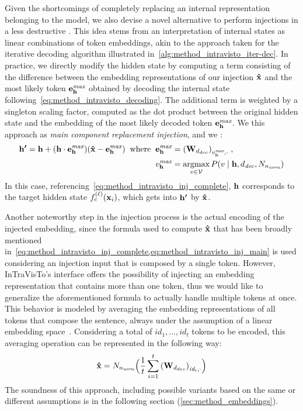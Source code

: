 Given the shortcomings of completely replacing an internal representation belonging to the model, we also devise a novel alternative to perform injections in a less destructive .
This idea stems from an interpretation of internal states as linear combinations of token embeddings, akin to the approach taken for the iterative decoding algorithm illustrated in~\cref{alg:method_intravisto_iter-dec}.
In practice, we directly modify the hidden state by computing a term consisting of the difference between the embedding representations of our injection $\bm{\mathbf{\hat x}}$ and the most likely token $\bm{\mathbf{e}}_{\bm{\mathbf{h}}}^{\textit{max}}$ obtained by decoding the internal state following~\cref{eq:method_intravisto_decoding}.
The additional term is weighted by a singleton scaling factor, computed as the dot product between the original hidden state and the embedding of the most likely decoded token $\bm{\mathbf{e}}_{\bm{\mathbf{h}}}^{\textit{max}}$.
We  this approach as \emph{main component replacement injection}, and we :
\begin{equation}
    \label{eq:method_intravisto_inj_main}
    \begin{aligned}
    \gbm{h'} = \gbm{h} + (\gbm{h} \cdot \gbm{e}_{\gbm{h}}^{\textit{max}})(\gbm{\hat x} - \gbm{e}_{\gbm{h}}^{\textit{max}})
    \;\; \text{where} \;\; &\gbm{e}_{\gbm{h}}^{\textit{max}} = {(\gbm{W}_{d_{dec}})}_{v_{\gbm{h}}^{\textit{max}},\cdot} \; , \\
    &v_{\gbm{h}}^{\textit{max}} = \operatornamewithlimits{argmax}_{v \in \mathcal{V}} P(v \mid \gbm{h}, d_\textit{dec}, N_{n_\textit{norm}})
    \end{aligned}
\end{equation}
In this case, referencing~\cref{eq:method_intravisto_inj_complete}, $\bm{\mathbf{h}}$ corresponds to the target hidden state $f_c^{(\ell)}(\bm{\mathbf{x}}_i)$, which gets  into $\bm{\mathbf{h'}}$ by $\bm{\mathbf{\hat x}}$.

Another noteworthy step in the injection process is the actual encoding of the injected embedding, since the formula used to compute $\bm{\mathbf{\hat x}}$ that has been broadly mentioned in~\cref{eq:method_intravisto_inj_complete,eq:method_intravisto_inj_main} is used considering an injection input that is composed by a single token.
However, InTraVisTo's interface offers the possibility of injecting an embedding representation that contains more than one token, thus we would like to generalize the aforementioned formula to actually handle multiple tokens at once.
This behavior is modeled by averaging the embedding representations of all tokens that compose the sentence, always under the assumption of a linear embedding space~\cite{mikolov2013,park2023}.
Considering a total of $id_1,\ldots,id_t$ tokens to be encoded, this averaging operation can be represented in the following way:
\begin{equation}
    \label{eq:method_intravisto_emb-avg}
    \bm{\mathbf{\hat x}} = N_{n_\textit{norm}}\Bigl(\frac{1}{t} \sum_{i=1}^{t}{{(\bm{\mathbf{W}}_{d_{dec}})}_{\textit{id}_{i},\cdot}}\Bigr)
\end{equation}
The soundness of this approach, including possible variants based on the same or different assumptions is  in the following section (\cref{sec:method_embeddings}).


